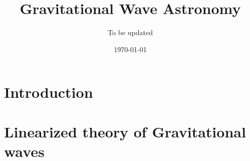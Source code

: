 \documentclass[16pt, a4paper]{report}
\title{Gravitational Wave Astronomy}
\author{To be updated}
\date{\today}
\begin{document}
\maketitle

\pagebreak

\pagebreak

\pagebreak
\section{Introduction}




\pagebreak

\pagebreak

\section{Linearized theory of Gravitational waves}


\pagebreak

\end{document}
